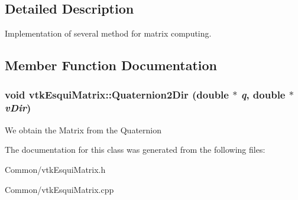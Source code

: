 \subsection{Detailed Description}
Implementation of several method for matrix computing. 

\subsection{Member Function Documentation}
\hypertarget{classvtkEsquiMatrix_a57a339771fe24ae2dad4660910c61c3b}{
\subsubsection[{Quaternion2Dir}]{\setlength{\rightskip}{0pt plus 5cm}void vtkEsquiMatrix::Quaternion2Dir (double $\ast$ {\em q}, \/  double $\ast$ {\em vDir})}}
\label{classvtkEsquiMatrix_a57a339771fe24ae2dad4660910c61c3b}


We obtain the Matrix from the Quaternion 

The documentation for this class was generated from the following files:\begin{DoxyCompactItemize}
\item 
Common/vtkEsquiMatrix.h\item 
Common/vtkEsquiMatrix.cpp\end{DoxyCompactItemize}

